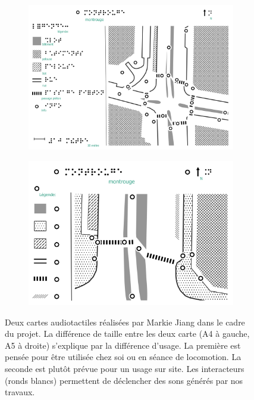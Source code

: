 \begin{figure}[ht]
    \centering
    \begin{subfigure}[t]{.49\linewidth}
        \centering
        \includegraphics[width=\textwidth]{images/experimentation/poc1_a4.png}
    \end{subfigure}
    \begin{subfigure}[t]{.49\linewidth}
        \centering
        \includegraphics[width=\textwidth]{images/experimentation/poc1_a5.png}
    \end{subfigure}
    \caption[Exemples de cartes audiotactiles]{Deux cartes audiotactiles réalisées par Markie Jiang \citep{jiang:tel-04500971} dans le cadre du projet. La différence de taille entre les deux carte (A4 à gauche, A5 à droite) s'explique par la différence d'usage. La première est pensée pour être utilisée chez soi ou en séance de locomotion. La seconde est plutôt prévue pour un usage sur site. Les interacteurs (ronds blancs) permettent de déclencher des sons générés par nos travaux.}
    \label{fig:experimentation_exemples_cartes_audiotactiles}
\end{figure}

